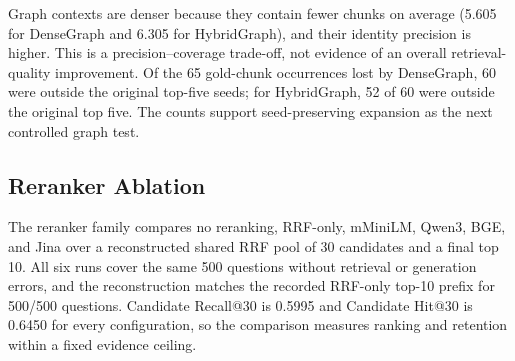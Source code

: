 Graph contexts are denser because they contain fewer chunks on average (5.605
for DenseGraph and 6.305 for HybridGraph), and their identity precision is
higher. This is a precision--coverage trade-off, not evidence of an overall
retrieval-quality improvement. Of the 65 gold-chunk occurrences lost by
DenseGraph, 60 were outside the original top-five seeds; for HybridGraph, 52
of 60 were outside the original top five. The counts support seed-preserving
expansion as the next controlled graph test.

\begin{table}[t]
\centering
\scriptsize
\caption{Effect of graph expansion on top-10 gold evidence. Counts are over
400 answerable questions; graph-only gold is introduced by expansion and
graph-missed gold was present before expansion but absent afterward. The
fallback column is the fraction of 100 unanswerable outputs containing the
family-specific Vietnamese fallback phrase.}
\label{tab:graph-effect}
\end{table}

\subsection{Reranker Ablation}
\label{sec:ablation-reranking}

The reranker family compares no reranking, RRF-only, mMiniLM, Qwen3, BGE,
and Jina over a reconstructed shared RRF pool of 30 candidates and a final
top 10. All six runs cover the same 500 questions without retrieval or
generation errors, and the reconstruction matches the recorded RRF-only
top-10 prefix for 500/500 questions. Candidate Recall@30 is 0.5995 and
Candidate Hit@30 is 0.6450 for every configuration, so the comparison measures
ranking and retention within a fixed evidence ceiling.

